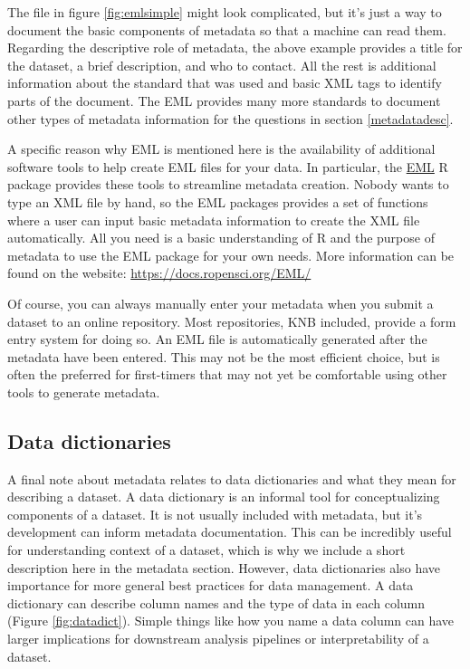 \documentclass[
]{book}
\begin{document}
The file in figure \ref{fig:emlsimple} might look complicated, but it's just a way to document the basic components of metadata so that a machine can read them. Regarding the descriptive role of metadata, the above example provides a title for the dataset, a brief description, and who to contact. All the rest is additional information about the standard that was used and basic XML tags to identify parts of the document. The EML provides many more standards to document other types of metadata information for the questions in section \ref{metadatadesc}.

A specific reason why EML is mentioned here is the availability of additional software tools to help create EML files for your data. In particular, the \href{https://docs.ropensci.org/EML/}{EML} R package provides these tools to streamline metadata creation. Nobody wants to type an XML file by hand, so the EML packages provides a set of functions where a user can input basic metadata information to create the XML file automatically. All you need is a basic understanding of R and the purpose of metadata to use the EML package for your own needs. More information can be found on the website: \url{https://docs.ropensci.org/EML/}

Of course, you can always manually enter your metadata when you submit a dataset to an online repository. Most repositories, KNB included, provide a form entry system for doing so. An EML file is automatically generated after the metadata have been entered. This may not be the most efficient choice, but is often the preferred for first-timers that may not yet be comfortable using other tools to generate metadata.

\hypertarget{dict}{%
\subsection{Data dictionaries}\label{dict}}

A final note about metadata relates to data dictionaries and what they mean for describing a dataset. A data dictionary is an informal tool for conceptualizing components of a dataset. It is not usually included with metadata, but it's development can inform metadata documentation. This can be incredibly useful for understanding context of a dataset, which is why we include a short description here in the metadata section. However, data dictionaries also have importance for more general best practices for data management. A data dictionary can describe column names and the type of data in each column (Figure \ref{fig:datadict}). Simple things like how you name a data column can have larger implications for downstream analysis pipelines or interpretability of a dataset.
\end{document}
